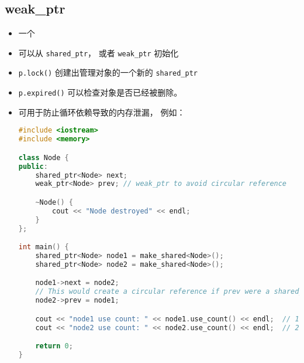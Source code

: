 \subsection{weak\_ptr}
\begin{itemize}
\item 一个 
\item 可以从 \verb`shared_ptr`， 或者 \verb`weak_ptr` 初始化
\item \verb`p.lock()` 创建出管理对象的一个新的 \verb`shared_ptr`
\item \verb`p.expired()` 可以检查对象是否已经被删除。
\item 可用于防止循环依赖导致的内存泄漏， 例如：
\begin{lstlisting}[language=cpp]
#include <iostream>
#include <memory>

class Node {
public:
    shared_ptr<Node> next;
    weak_ptr<Node> prev; // weak_ptr to avoid circular reference

    ~Node() {
        cout << "Node destroyed" << endl;
    }
};

int main() {
    shared_ptr<Node> node1 = make_shared<Node>();
    shared_ptr<Node> node2 = make_shared<Node>();

    node1->next = node2;
    // This would create a circular reference if prev were a shared_ptr
    node2->prev = node1;

    cout << "node1 use count: " << node1.use_count() << endl;  // 1
    cout << "node2 use count: " << node2.use_count() << endl;  // 2

    return 0;
}
\end{lstlisting}
\end{itemize}
